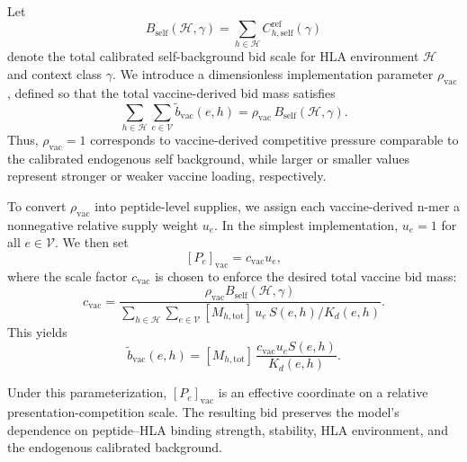 \documentclass[11pt]{article}
\begin{document}
Let
\[
B_{\mathrm{self}}(\mathcal{H},\gamma)
=
\sum_{h\in \mathcal{H}} C^{\mathrm{ref}}_{h,\mathrm{self}}(\gamma)
\]
denote the total calibrated self-background bid scale for HLA environment \(\mathcal{H}\)
and context class \(\gamma\). We introduce a dimensionless implementation
parameter \(\rho_{\mathrm{vac}}\), defined so that the total vaccine-derived bid
mass satisfies
\[
\sum_{h\in \mathcal{H}}\sum_{e\in\mathcal V}
\widetilde b_{\mathrm{vac}}(e,h)
=
\rho_{\mathrm{vac}}\,
B_{\mathrm{self}}(\mathcal{H},\gamma).
\]
Thus, \(\rho_{\mathrm{vac}}=1\) corresponds to vaccine-derived competitive
pressure comparable to the calibrated endogenous self background, while larger
or smaller values represent stronger or weaker vaccine loading, respectively.

To convert \(\rho_{\mathrm{vac}}\) into peptide-level supplies, we assign each
vaccine-derived n-mer a nonnegative relative supply weight \(u_e\). In the
simplest implementation, \(u_e=1\) for all \(e\in\mathcal V\). We then set
\[
[P_e]_{\mathrm{vac}} = c_{\mathrm{vac}} u_e,
\]
where the scale factor \(c_{\mathrm{vac}}\) is chosen to enforce the desired
total vaccine bid mass:
\[
c_{\mathrm{vac}}
=
\frac{
\rho_{\mathrm{vac}} B_{\mathrm{self}}(\mathcal{H},\gamma)
}{
\sum_{h\in \mathcal{H}}\sum_{e\in\mathcal V}
[M_{h,\mathrm{tot}}]\,
u_e\,S(e,h)/K_d(e,h)
}.
\]
This yields
\[
\widetilde b_{\mathrm{vac}}(e,h)
=
[M_{h,\mathrm{tot}}]\,
\frac{c_{\mathrm{vac}}u_e S(e,h)}{K_d(e,h)}.
\]

Under this parameterization, \([P_e]_{\mathrm{vac}}\) is an effective coordinate
on a relative presentation-competition scale. The resulting bid preserves the
model's dependence on peptide--HLA binding strength, stability, HLA environment,
and the endogenous calibrated background.
\end{document}
